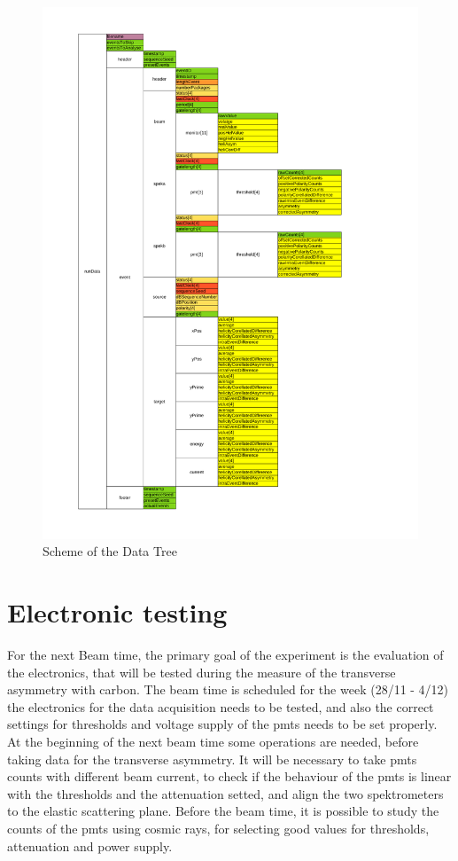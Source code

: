 \documentclass[10pt,a4paper]{article}
\begin{document}
\begin{figure}[!hbtp]
\centering
\includegraphics[scale= 0.7]{figures/RunDataStructure.pdf}
\caption{Scheme of the Data Tree}
\label{Data-tree}
\end{figure}


\section{Electronic testing}

For the next Beam time, the primary goal of the experiment is the evaluation of the electronics, that will be tested during the measure of the transverse asymmetry with carbon. The beam time is scheduled for the week (28/11 - 4/12) the electronics for the data acquisition needs to be tested, and also the correct settings for thresholds and voltage supply of the pmts needs to be set properly. At the beginning of the next beam time some operations are needed, before taking data for the transverse asymmetry.  It will be necessary to take pmts counts with different beam current, to check if the behaviour of the pmts is linear with the thresholds and the attenuation setted, and align the two spektrometers to the elastic scattering plane. Before the beam time, it is possible to study the counts of the pmts using cosmic rays, for selecting good values for thresholds, attenuation and power supply.
\end{document}
